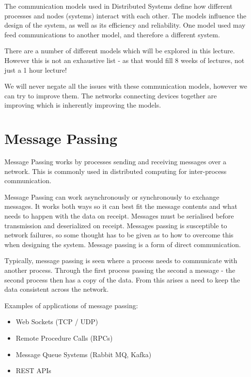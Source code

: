 
The communication models used in Distributed Systems define how different processes and nodes (systems) interact with each other. The models influence the design of the system, as well as its efficiency and reliability. One model used may feed communications to another model, and therefore a different system. 

There are a number of different models which will be explored in this lecture. However this is not an exhaustive list - as that would fill 8 weeks of lectures, not just a 1 hour lecture!

We will never negate all the issues with these communication models, however we can try to improve them. The networks connecting devices together are improving which is inherently improving the models. 

\section{Message Passing}
Message Passing works by processes sending and receiving messages over a network. This is commonly used in distributed computing for inter-process communication. 

Message Passing can work asynchronously or synchronously to exchange messages. It works both ways so it can best fit the message contents and what needs to happen with the data on receipt. Messages must be serialised before transmission and deserialized on receipt. Messages passing is susceptible to network failures, so some thought has to be given as to how to overcome this when designing the system. Message passing is a form of direct communication.

Typically, message passing is seen where a process needs to communicate with another process. Through the first process passing the second a message - the second process then has a copy of the data. From this arises a need to keep the data consistent across the network.

Examples of applications of message passing:
\begin{itemize}
    \item Web Sockets (TCP / UDP)
    \item Remote Procedure Calls (RPCs)
    \item Message Queue Systems (Rabbit MQ, Kafka)
    \item REST APIs
\end{itemize}

